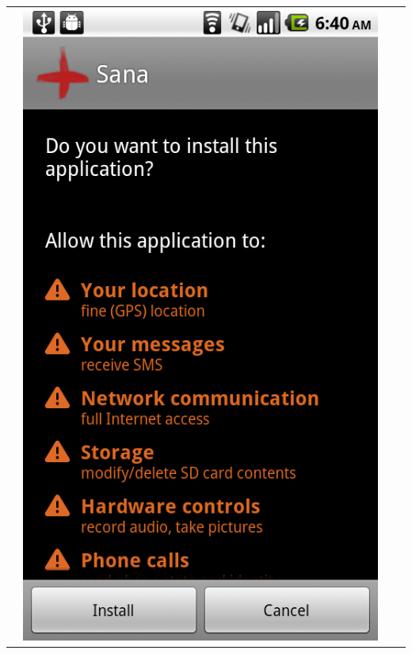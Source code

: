 \documentclass[a4paper,10pt]{article}
\begin{document}
\begin{tabular}{ c c c c }
&\includegraphics[scale=0.2,keepaspectratio=true]{client_install_confirmation.png}

\end{tabular}
\end{document}

